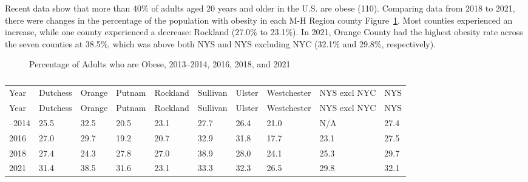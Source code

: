 \documentclass[
  english,
  letterpaper,
]{report}
\begin{document}
Recent data show that more than 40\% of adults aged 20 years and older
in the U.S. are obese (110). Comparing data from 2018 to 2021, there
were changes in the percentage of the population with obesity in each
M-H Region county Figure~\ref{fig-adult-obese-percent}. Most counties
experienced an increase, while one county experienced a decrease:
Rockland (27.0\% to 23.1\%). In 2021, Orange County had the highest
obesity rate across the seven counties at 38.5\%, which was above both
NYS and NYS excluding NYC (32.1\% and 29.8\%, respectively).

\begin{figure}


\caption{\label{fig-adult-obese-percent}Percentage of Adults who are
Obese, 2013--2014, 2016, 2018, and 2021}

\end{figure}%

\begin{longtable}[]{@{}llllllllll@{}}

\caption{\label{tbl-adult-obese-percent}Percentage of Adults who are
Obese, 2013--2014, 2016, 2018, and 2021}

\tabularnewline

\caption{}\label{T_def4a}\tabularnewline
\toprule\noalign{}
Year & Dutchess & Orange & Putnam & Rockland & Sullivan & Ulster &
Westchester & NYS excl NYC & NYS \\
\midrule\noalign{}
\endfirsthead
\toprule\noalign{}
Year & Dutchess & Orange & Putnam & Rockland & Sullivan & Ulster &
Westchester & NYS excl NYC & NYS \\
\midrule\noalign{}
\endhead
\bottomrule\noalign{}
\endlastfoot
2013--2014 & 25.5 & 32.5 & 20.5 & 23.1 & 27.7 & 26.4 & 21.0 & N/A &
27.4 \\
2016 & 27.0 & 29.7 & 19.2 & 20.7 & 32.9 & 31.8 & 17.7 & 23.1 & 27.5 \\
2018 & 27.4 & 24.3 & 27.8 & 27.0 & 38.9 & 28.0 & 24.1 & 25.3 & 29.7 \\
2021 & 31.4 & 38.5 & 31.6 & 23.1 & 33.3 & 32.3 & 26.5 & 29.8 & 32.1 \\

\end{longtable}
\end{document}
